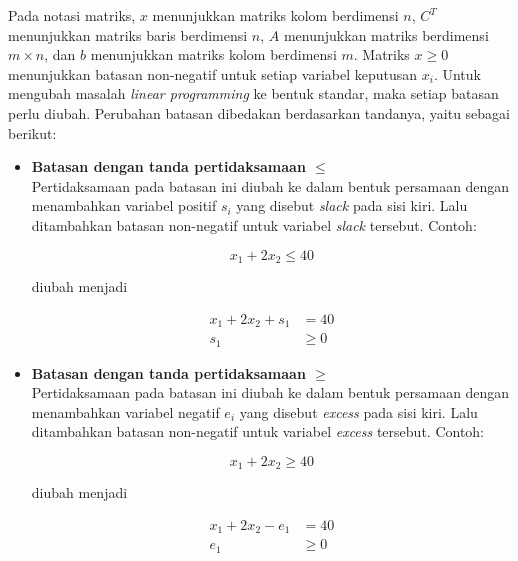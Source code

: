 Pada notasi matriks, $x$ menunjukkan matriks kolom berdimensi $n$, $C^T$ menunjukkan matriks baris berdimensi $n$, $A$ menunjukkan matriks berdimensi $m\times n$, dan $b$ menunjukkan matriks kolom berdimensi $m$. Matriks $x\geq0$ menunjukkan batasan non-negatif untuk setiap variabel keputusan $x_i$. Untuk mengubah masalah \textit{linear programming} ke bentuk standar, maka setiap batasan perlu diubah. Perubahan batasan dibedakan berdasarkan tandanya, yaitu sebagai berikut:
		
		\begin{itemize}
			\item \textbf{Batasan dengan tanda pertidaksamaan \(\leq\)}\\
				Pertidaksamaan pada batasan ini diubah ke dalam bentuk persamaan dengan menambahkan variabel positif \(s_i\) yang disebut \textit{slack} pada sisi kiri. Lalu ditambahkan batasan non-negatif untuk variabel \textit{slack} tersebut. Contoh:
				
				\begin{equation*}
					x_1 + 2x_2 \leq 40
				\end{equation*}
				
				diubah menjadi
				
				\begin{equation*}
					\begin{split}
						x_1 + 2x_2 + s_1 &= 40\\
						s_1 &\geq 0
					\end{split}
				\end{equation*}
			
			\item \textbf{Batasan dengan tanda pertidaksamaan \(\geq\)}\\			
				Pertidaksamaan pada batasan ini diubah ke dalam bentuk persamaan dengan menambahkan variabel negatif \(e_i\) yang disebut \textit{excess} pada sisi kiri. Lalu ditambahkan batasan non-negatif untuk variabel \textit{excess} tersebut. Contoh:
				
				\begin{equation*}
					x_1 + 2x_2 \geq 40
				\end{equation*}
				
				diubah menjadi
				
				\begin{equation*}
					\begin{split}
						x_1 + 2x_2 - e_1 &= 40\\
						e_1 &\geq 0
					\end{split}
				\end{equation*}				
		\end{itemize}
		
